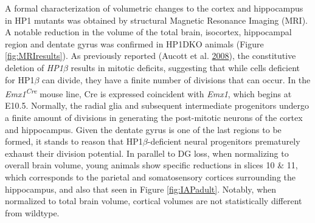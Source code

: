 \documentclass[onehalf,12pt]{beavtex}
\begin{document}
  A formal characterization of volumetric changes to the cortex and
  hippocampus in HP1 mutants was obtained by structural Magnetic Resonance
  Imaging (MRI). A notable reduction in the volume of the total brain,
  isocortex, hippocampal region and dentate gyrus was confirmed in HP1DKO
  animals (Figure \ref{fig:MRIresults}). As previously reported (Aucott et
  al. \protect\hyperlink{ref-AucottHP1requireddevelopment2008}{2008}), the
  constitutive deletion of \emph{HP1\(\beta\)} results in mitotic
  deficits, suggesting that while cells deficient for HP1\(\beta\) can
  divide, they have a finite number of divisions that can occur. In the
  \emph{Emx1\textsuperscript{Cre}} mouse line, Cre is expressed coincident
  with \emph{Emx1}, which begins at E10.5. Normally, the radial glia and
  subsequent intermediate progenitors undergo a finite amount of divisions
  in generating the post-mitotic neurons of the cortex and hippocampus.
  Given the dentate gyrus is one of the last regions to be formed, it
  stands to reason that HP1\(\beta\)-deficient neural progenitors
  prematurely exhaust their division potential. In parallel to DG loss,
  when normalizing to overall brain volume, young animals show specific
  reductions in slices 10 \& 11, which corresponds to the parietal and
  somatosensory cortices surrounding the hippocampus, and also that seen
  in Figure \ref{fig:IAPadult}. Notably, when normalized to total brain
  volume, cortical volumes are not statistically different from wildtype.
  
\end{document}
